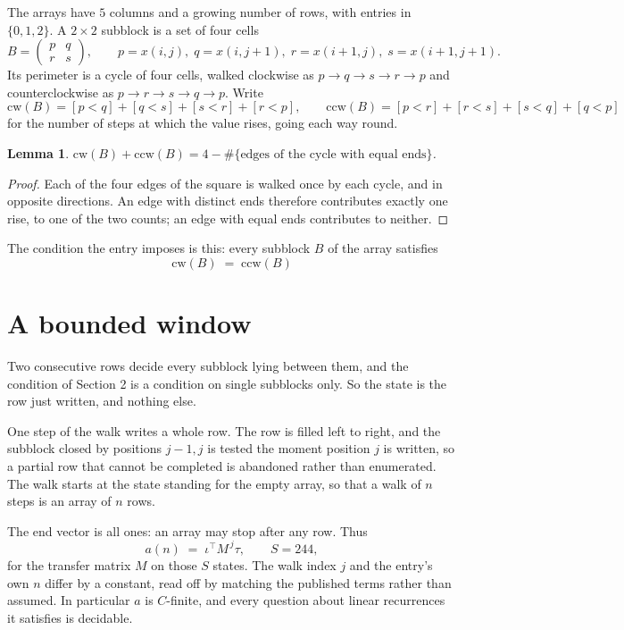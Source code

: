 \documentclass[11pt,a4paper]{article}
\theoremstyle{plain}
\newtheorem{lemma}[theorem]{Lemma}
\theoremstyle{definition}
\begin{document}
The arrays have $5$ columns and a growing number of rows, with entries in $\{0,1,2\}$. A
$2\times2$ subblock is a set of four cells
\[
B=\begin{pmatrix} p & q \\ r & s \end{pmatrix},
\qquad p=x(i,j),\; q=x(i,j+1),\; r=x(i+1,j),\; s=x(i+1,j+1).
\]
Its perimeter is a cycle of four cells, walked clockwise as $p\to q\to s\to r\to p$ and
counterclockwise as $p\to r\to s\to q\to p$. Write
\[
\mathrm{cw}(B)=[p<q]+[q<s]+[s<r]+[r<p],\qquad
\mathrm{ccw}(B)=[p<r]+[r<s]+[s<q]+[q<p]
\]
for the number of steps at which the value rises, going each way round.

\begin{lemma}\label{lem:sum}
$\mathrm{cw}(B)+\mathrm{ccw}(B)=4-\#\{\text{edges of the cycle with equal ends}\}$.
\end{lemma}

\begin{proof}
Each of the four edges of the square is walked once by each cycle, and in opposite directions.
An edge with distinct ends therefore contributes exactly one rise, to one of the two counts;
an edge with equal ends contributes to neither.
\end{proof}

The condition the entry imposes is this: every subblock $B$ of the array satisfies
\[
\mathrm{cw}(B)\;=\;\mathrm{ccw}(B)
\]


\section{A bounded window}

Two consecutive rows decide every subblock lying between them, and the condition of Section 2 is a condition on single subblocks only. So the state is the row just written, and nothing else.

One step of the walk writes a whole row. The row is filled left to right, and the subblock
closed by positions $j-1,j$ is tested the moment position $j$ is written, so a partial row that
cannot be completed is abandoned rather than enumerated. The walk starts at the state standing
for the empty array, so that a walk of $n$ steps is an array of $n$ rows.

The end vector is all ones: an array may stop after any row. Thus
\[
a(n)\;=\;\iota^{\!\top}M^{\,j}\tau ,\qquad S=244,
\]
for the transfer matrix $M$ on those $S$ states. The walk index $j$ and the entry's own $n$
differ by a constant, read off by matching the published terms rather than assumed. In
particular $a$ is $C$-finite, and every question about linear recurrences it satisfies is
decidable.
\end{document}
